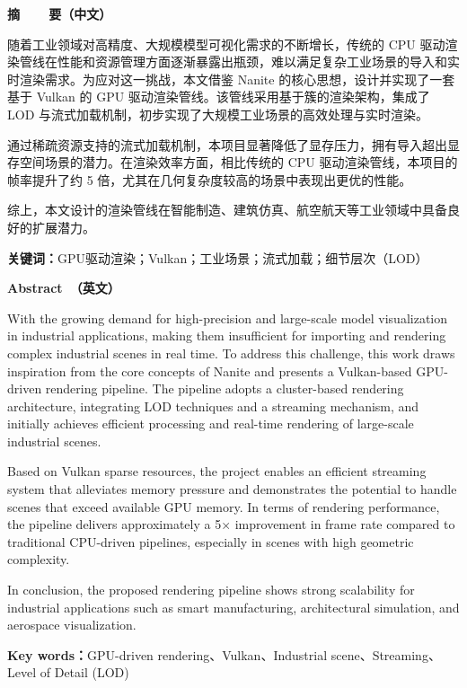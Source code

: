 \cleardoublepage{}

\vspace*{-2em}

\begin{center}
    \bfseries {} 摘~~~~要（中文）
\end{center}

随着工业领域对高精度、大规模模型可视化需求的不断增长，传统的 CPU 驱动渲染管线在性能和资源管理方面逐渐暴露出瓶颈，难以满足复杂工业场景的导入和实时渲染需求。为应对这一挑战，本文借鉴 Nanite 的核心思想，设计并实现了一套基于 Vulkan 的 GPU 驱动渲染管线。该管线采用基于簇的渲染架构，集成了 LOD 与流式加载机制，初步实现了大规模工业场景的高效处理与实时渲染。

通过稀疏资源支持的流式加载机制，本项目显著降低了显存压力，拥有导入超出显存空间场景的潜力。在渲染效率方面，相比传统的 CPU 驱动渲染管线，本项目的帧率提升了约 5 倍，尤其在几何复杂度较高的场景中表现出更优的性能。

综上，本文设计的渲染管线在智能制造、建筑仿真、航空航天等工业领域中具备良好的扩展潜力。

\vspace{1em}

\noindent\textbf{关键词：}GPU驱动渲染；Vulkan；工业场景；流式加载；细节层次（LOD）

\cleardoublepage{}

\vspace*{-2em}

\begin{center}
    \bfseries {} Abstract~（英文）
\end{center}

With the growing demand for high-precision and large-scale model visualization in industrial applications, making them insufficient for importing and rendering complex industrial scenes in real time. To address this challenge, this work draws inspiration from the core concepts of Nanite and presents a Vulkan-based GPU-driven rendering pipeline. The pipeline adopts a cluster-based rendering architecture, integrating LOD techniques and a streaming mechanism, and initially achieves efficient processing and real-time rendering of large-scale industrial scenes.

Based on Vulkan sparse resources, the project enables an efficient streaming system that alleviates memory pressure and demonstrates the potential to handle scenes that exceed available GPU memory. In terms of rendering performance, the pipeline delivers approximately a 5× improvement in frame rate compared to traditional CPU-driven pipelines, especially in scenes with high geometric complexity.

In conclusion, the proposed rendering pipeline shows strong scalability for industrial applications such as smart manufacturing, architectural simulation, and aerospace visualization.

\vspace{1em}

\noindent\textbf{Key words：}GPU-driven rendering、Vulkan、Industrial scene、Streaming、Level of Detail (LOD)